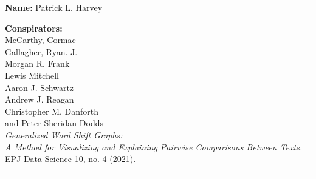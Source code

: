 \textbf{Name:} Patrick L. Harvey\\

\medskip

\textbf{Conspirators:}\\
McCarthy, Cormac\\
Gallagher, Ryan. J.\\
Morgan R. Frank\\
Lewis Mitchell\\
Aaron J. Schwartz\\
Andrew J. Reagan\\
Christopher M. Danforth\\
and Peter Sheridan Dodds\\
\textit{Generalized Word Shift Graphs:}\\
\textit{A Method for Visualizing and Explaining Pairwise Comparisons Between Texts.}\\
EPJ Data Science 10, no. 4 (2021).

\medskip
\medskip

\hrule

\medskip



